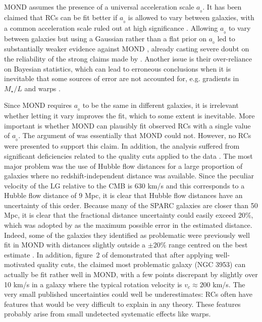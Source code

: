 \documentclass[fleqn,usenatbib,useAMS]{mnras} %
\begin{document}
MOND assumes the presence of a universal acceleration scale $a_{_0}$. It has been claimed that RCs can be fit better if $a_{_0}$ is allowed to vary between galaxies, with a common acceleration scale ruled out at high significance \citep{Rodrigues_2018}. Allowing $a_{_0}$ to vary between galaxies but using a Gaussian rather than a flat prior on $a_{_0}$ led to substantially weaker evidence against MOND \citep{Chang_2019}, already casting severe doubt on the reliability of the strong claims made by \citet{Rodrigues_2018}. Another issue is their over-reliance on Bayesian statistics, which can lead to erroneous conclusions when it is inevitable that some sources of error are not accounted for, e.g. gradients in $M_{\star}/L$ and warps \citep{Cameron_2020}.

Since MOND requires $a_{_0}$ to be the same in different galaxies, it is irrelevant whether letting it vary improves the fit, which to some extent is inevitable. More important is whether MOND can plausibly fit observed RCs with a single value of $a_{_0}$. The argument of \citet{Rodrigues_2018} was essentially that MOND could not. However, no RCs were presented to support this claim. In addition, the analysis suffered from significant deficiencies related to the quality cuts applied to the data \citep{Kroupa_2018}. The most major problem was the use of Hubble flow distances for a large proportion of galaxies where no redshift-independent distance was available. Since the peculiar velocity of the LG relative to the CMB is 630 km/s \citep{Kogut_1993} and this corresponds to a Hubble flow distance of 9 Mpc, it is clear that Hubble flow distances have an uncertainty of this order. Because many of the SPARC galaxies are closer than 50 Mpc, it is clear that the fractional distance uncertainty could easily exceed 20\%, which was adopted by \citet{Rodrigues_2018} as the maximum possible error in the estimated distance. Indeed, some of the galaxies they identified as problematic were previously well fit in MOND with distances slightly outside a $\pm20\%$ range centred on the best estimate \citep{Li_2018}. In addition, figure~2 of \citet{Kroupa_2018} demonstrated that after applying well-motivated quality cuts, the claimed most problematic galaxy (NGC 3953) can actually be fit rather well in MOND, with a few points discrepant by slightly over 10 km/s in a galaxy where the typical rotation velocity is $v_c \approx 200$ km/s. The very small published uncertainties could well be underestimates: RCs often have features that would be very difficult to explain in any theory. These features probably arise from small undetected systematic effects like warps.
\end{document}
